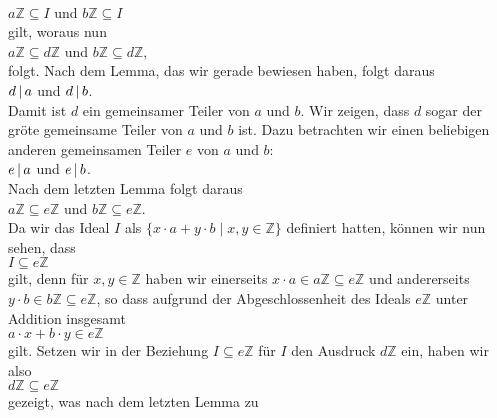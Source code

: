 \\[0.2cm]
\hspace*{1.3cm}
$a\mathbb{Z} \subseteq I$ \quad und \quad $b\mathbb{Z} \subseteq I$
\\[0.2cm]
gilt, woraus nun
\\[0.2cm]
\hspace*{1.3cm}
$a\mathbb{Z} \subseteq d\mathbb{Z}$ \quad und \quad $b\mathbb{Z} \subseteq d\mathbb{Z}$,
\\[0.2cm]
folgt.  Nach dem Lemma, das wir gerade bewiesen haben, folgt daraus
\\[0.2cm]
\hspace*{1.3cm}
$d \,|\, a$ \quad und \quad $d \,|\, b$.
\\[0.2cm]
Damit ist $d$ ein gemeinsamer Teiler von $a$ und $b$.  Wir zeigen, dass $d$ sogar der gr\"{o}\3te gemeinsame
Teiler von $a$ und $b$ ist.  Dazu betrachten wir einen beliebigen anderen gemeinsamen Teiler $e$ von $a$ und
$b$: 
\\[0.2cm]
\hspace*{1.3cm}
$e \,|\, a$ \quad und \quad $e \,|\, b$.
\\[0.2cm]
Nach dem letzten Lemma folgt daraus
\\[0.2cm]
\hspace*{1.3cm}
$a\mathbb{Z} \subseteq e\mathbb{Z}$ \quad und \quad $b\mathbb{Z} \subseteq e\mathbb{Z}$.
\\[0.2cm]
Da wir das Ideal $I$ als $\bigl\{ x \cdot a + y \cdot b \mid x,y \in \mathbb{Z} \bigr\}$ definiert hatten,
k\"{o}nnen wir nun sehen, dass 
\\[0.2cm]
\hspace*{1.3cm}
$I \subseteq e\mathbb{Z}$
\\[0.2cm]
gilt, denn f\"{u}r $x,y \in \mathbb{Z}$ haben wir einerseits $x \cdot a \in a\mathbb{Z} \subseteq e\mathbb{Z}$
und andererseits $y \cdot b \in b\mathbb{Z} \subseteq e\mathbb{Z}$, so dass aufgrund der Abgeschlossenheit
des Ideals $e\mathbb{Z}$ unter Addition insgesamt
\\[0.2cm]
\hspace*{1.3cm}
$a \cdot x + b \cdot y \in e\mathbb{Z}$
\\[0.2cm]
gilt.  Setzen wir in der Beziehung $I \subseteq e\mathbb{Z}$ f\"{u}r $I$ den Ausdruck $d\mathbb{Z}$ ein, haben
wir also 
\\[0.2cm]
\hspace*{1.3cm}
$d\mathbb{Z} \subseteq e\mathbb{Z}$
\\[0.2cm]
gezeigt, was nach dem letzten Lemma zu
\\[0.2cm]
